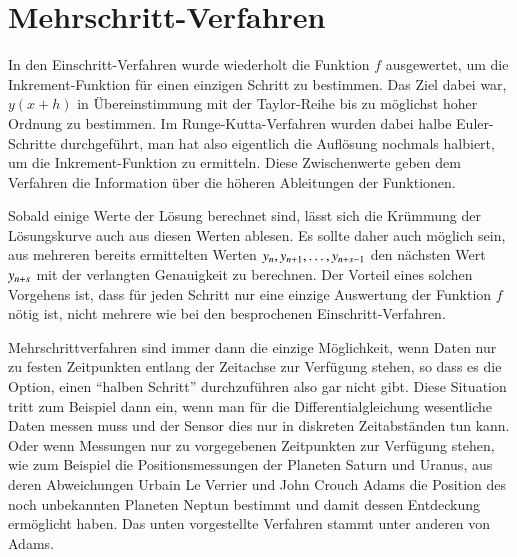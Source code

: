 %
%
%
\section{Mehrschritt-Verfahren}
In den Einschritt-Verfahren wurde wiederholt die Funktion $f$ ausgewertet,
um die Inkrement-Funk\-tion für einen einzigen Schritt zu bestimmen.
Das Ziel dabei war, $y(x+h)$ in Übereinstimmung mit der Taylor-Reihe
bis zu möglichst hoher Ordnung zu bestimmen.
Im Runge-Kutta-Verfahren wurden dabei halbe Euler-Schritte durchgeführt,
man hat also eigentlich die Auflösung nochmals halbiert, um die
Inkrement-Funktion zu ermitteln.
Diese Zwischenwerte geben dem Verfahren die Information über die
höheren Ableitungen der Funktionen.

Sobald einige Werte der Lösung berechnet sind, lässt sich die Krümmung
der Lösungskurve auch aus diesen Werten ablesen.
Es sollte daher auch möglich sein, aus mehreren bereits
ermittelten Werten $y_{n\mathstrut},y_{n+1},\dots,y_{n+s-1}$
den nächsten Wert $y_{n+s\mathstrut}$ mit der verlangten Genauigkeit
zu berechnen.
Der Vorteil eines solchen Vorgehens ist, dass für jeden Schritt nur 
eine einzige Auswertung der Funktion $f$ nötig ist,
nicht mehrere wie bei den besprochenen Einschritt-Verfahren.

Mehrschrittverfahren sind immer dann die einzige Möglichkeit, wenn Daten
nur zu festen Zeitpunkten entlang der Zeitachse zur Verfügung stehen,
so dass es die Option, einen ``halben Schritt'' durchzuführen also gar
nicht gibt.
Diese Situation tritt zum Beispiel dann ein, wenn man für die
Differentialgleichung wesentliche Daten messen muss und der
Sensor dies nur in diskreten Zeitabständen tun kann.
Oder wenn Messungen nur zu vorgegebenen Zeitpunkten zur Verfügung
stehen, wie zum Beispiel die Positionsmessungen der Planeten Saturn
%
und Uranus, aus deren Abweichungen Urbain Le Verrier und
%
%
John Crouch Adams die Position des noch unbekannten Planeten Neptun
%
%
bestimmt und damit dessen Entdeckung ermöglicht haben.
Das unten vorgestellte Verfahren stammt unter anderen von Adams.

